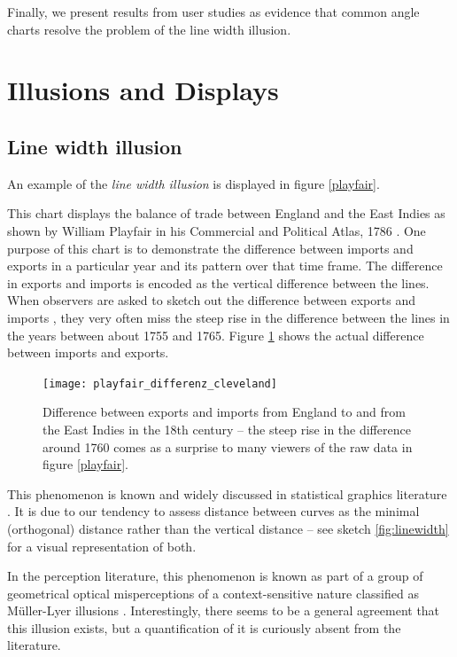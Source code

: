 Finally, we present results from user studies as evidence that common angle charts resolve the problem of the line width illusion. 


\section{Illusions and Displays}
\subsection{Line width illusion}
An example of the  {\it line width illusion} is displayed in  figure  \ref{playfair}. 


This chart displays the balance of trade between England and the East Indies as shown by William Playfair in his Commercial and Political Atlas, 1786 \cite{playfair, playfair2}.  One purpose of this chart is to demonstrate the difference between imports and exports in a particular year and its pattern over that time frame. The difference in exports and imports is encoded as the vertical difference between the lines. When observers are asked to sketch out the difference between exports and imports  \citep{cleveland:1984}, they very often  miss the steep rise in the difference between the lines in the years between about 1755 and 1765. Figure \ref{playfair2} shows the  actual difference between imports and exports. 



\begin{figure}
\centering
\texttt{[image: playfair\_differenz\_cleveland]}
\caption{\label{playfair2}
Difference between exports and imports from England to and from the East Indies in the 18th century -- the steep rise in the difference around 1760  comes as a surprise to many viewers of the raw data in figure \ref{playfair}.  }
\end{figure}


This phenomenon  is known and widely discussed in statistical graphics literature \citep{cleveland:1984, tufte, wainer:2000, robbins:2005}. It  is due to our  tendency to assess distance between curves as the minimal (orthogonal) distance rather than the  vertical distance -- see sketch \ref{fig:linewidth} for a visual representation of both.


In the perception literature, this phenomenon is known as part of a group of geometrical optical misperceptions of a context-sensitive nature classified as M\"uller-Lyer illusions \citep{day:1991}. Interestingly, there seems to be a general agreement that this illusion exists, but a quantification of it is curiously absent from the literature. 

